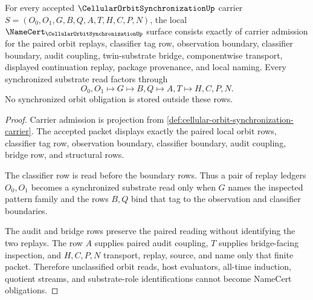\begin{theorem}
\label{thm:cellular-orbit-synchronization-namecert-obligations}
For every accepted $\CellularOrbitSynchronizationUp$ carrier $S=(O_0,O_1,G,B,Q,A,T,H,C,P,N)$, the local $\NameCert_{\CellularOrbitSynchronizationUp}$ surface consists exactly of carrier admission for the paired orbit replays, classifier tag row, observation boundary, classifier boundary, audit coupling, twin-substrate bridge, componentwise transport, displayed continuation replay, package provenance, and local naming. Every synchronized substrate read factors through
$$
O_0,O_1 \longmapsto G \longmapsto B,Q \longmapsto A,T \longmapsto H,C,P,N .
$$
No synchronized orbit obligation is stored outside these rows.
\end{theorem}
\begin{proof}
Carrier admission is projection from \autoref{def:cellular-orbit-synchronization-carrier}. The accepted packet displays exactly the paired local orbit rows, classifier tag row, observation boundary, classifier boundary, audit coupling, bridge row, and structural rows.

The classifier row is read before the boundary rows. Thus a pair of replay ledgers $O_0,O_1$ becomes a synchronized substrate read only when $G$ names the inspected pattern family and the rows $B,Q$ bind that tag to the observation and classifier boundaries.

The audit and bridge rows preserve the paired reading without identifying the two replays. The row $A$ supplies paired audit coupling, $T$ supplies bridge-facing inspection, and $H,C,P,N$ transport, replay, source, and name only that finite packet. Therefore unclassified orbit reads, host evaluators, all-time induction, quotient streams, and substrate-role identifications cannot become NameCert obligations.
\end{proof}

